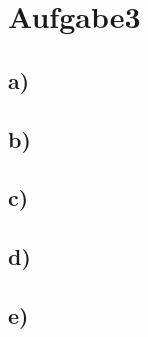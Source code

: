 \newpage
\section{Aufgabe3}
\label{sec:a3}


\subsection{a)}
\label{subsec:a3a}

\subsection{b)}
\label{subsec:a3b}

\subsection{c)}
\label{subsec:a3c}

\subsection{d)}
\label{subsec:a3d}

\subsection{e)}
\label{subsec:a3e}
